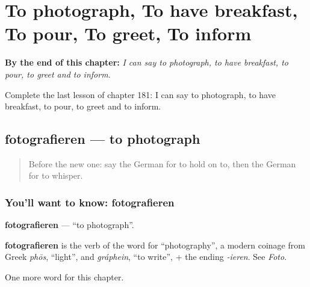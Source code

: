 
\chapter{To photograph, To have breakfast, To pour, To greet, To inform}
\label{ch:ge-to-photograph-to-have-breakfast-to-pour-to-greet-to-inform}

\begin{chapteropening}
\textbf{By the end of this chapter:} \emph{I can say to photograph, to have breakfast, to pour, to greet and to inform.}

Complete the last lesson of chapter 181: I can say to photograph, to have breakfast, to pour, to greet and to inform.
\end{chapteropening}

\section[fotografieren]{fotografieren — to photograph}

\label{lesson:GE-C181-fotografieren}



\begin{quote}
Before the new one: say the German for to hold on to, then the German for to whisper.
\end{quote}

\subsection*{You'll want to know: fotografieren}
\textbf{fotografieren} — \textquotedblleft{}to photograph\textquotedblright{}.

\begin{cousinweb}
\textbf{fotografieren} is the verb of the word for \textquotedblleft{}photography\textquotedblright{}, a modern coinage from Greek \emph{phōs}, \textquotedblleft{}light\textquotedblright{}, and \emph{gráphein}, \textquotedblleft{}to write\textquotedblright{}, + the ending \emph{-ieren}. See \emph{Foto}.
\end{cousinweb}

\begin{grammarlens}[title={What you've built}]
One more word for this chapter.
\end{grammarlens}

